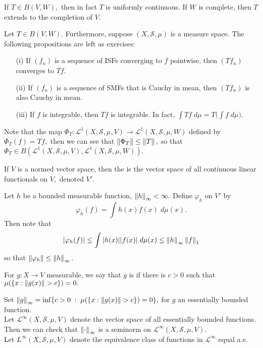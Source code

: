 If $T\in B(V,W),$ then in fact $T$ is uniformly continuous. If $W$ is complete, then $T$ extends to the completion of $V.$

\begin{prop}
Let $T\in B(V,W).$ Furthermore, suppose $(X,\mathcal{S},\mu)$ is a measure space. The following propositions are left as exercises:
\begin{enumerate}
\item[(i)] If $(f_n)$ is a sequence of ISFs converging to $f$ pointwise, then $(Tf_n)$ converges to $Tf.$
\item[(ii)] If $(f_n)$ is a sequence of SMFs that is Cauchy in mean, then $(Tf_n)$ is also Cauchy in mean.
\item[(iii)] If $f$ is integrable, then $Tf$ is integrable. In fact, $\int Tf\;d\mu=T\Big(\int f\;d\mu\Big).$
\end{enumerate}
\end{prop}

Note that the map $\Phi_T:\mathcal{L}^1(X,\mathcal{S},\mu,V)\rightarrow\mathcal{L}^1(X,\mathcal{S},\mu,W)$ defined by $\Phi_T(f)=Tf,$ then we can see that $\left\lVert\Phi_T\right\rVert\leq\left\lVert T\right\rVert,$ so that $\Phi_T\in B(\mathcal{L}^1(X,\mathcal{S},\mu,V),\mathcal{L}^1(X,\mathcal{S},\mu,W)).$ \\

\begin{defn}
If $V$ is a normed vector space, then the  is the vector space of all continuous linear functionals on $V,$ denoted $V'.$
\end{defn}

Let $h$ be a bounded measurable function, $\left\lVert h\right\rVert_{\infty}<\infty.$ Define $\varphi_h$ on $V'$ by
$$\varphi_h(f)=\int h(x)f(x)\;d\mu(x).$$
Then note that
$$|\varphi_h(f)|\leq\int|h(x)||f(x)|\;d\mu(x)\leq\left\lVert h\right\rVert_{\infty}\left\lVert f\right\rVert_1$$
so that $\left\lVert\varphi_h\right\rVert\leq\left\lVert h\right\rVert_{\infty}.$

\begin{defn}
For $g:X\rightarrow V$ measurable, we say that $g$ is  if there is $c>0$ such that $\mu(\{x:\left\lVert g(x)\right\rVert>c\})=0.$
\end{defn}

Set $\left\lVert g\right\rVert_{\infty}=\inf\{c>0\;:\;\mu(\{x:\left\lVert g(x)\right\rVert>c\})=0\},$ for $g$ an essentially bounded function.\\ 

Let $\mathcal{L}^{\infty}(X,\mathcal{S},\mu,V)$ denote the vector space of all essentially bounded functions. Then we can check that $\left\lVert\cdot\right\rVert_{\infty}$ is a seminorm on $\mathcal{L}^{\infty}(X,\mathcal{S},\mu,V).$ \\

Let $L^{\infty}(X,\mathcal{S},\mu, V)$ denote the equivalence class of functions in $\mathcal{L}^{\infty}$ equal a.e.